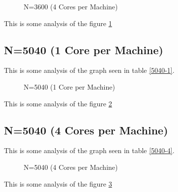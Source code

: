 \documentclass[a4paper]{article}
\begin{document}
\begin{figure}
    
    \caption{N=3600 (4 Cores per Machine)}
    \label{fig:3600_4}
\end{figure}

This is some analysis of the figure \ref{fig:3600_4}

\subsection{N=5040 (1 Core per Machine)}

This is some analysis of the graph seen in table \ref{5040-1}.

\begin{figure}
    
    \caption{N=5040 (1 Core per Machine)}
    \label{fig:5040_1}
\end{figure}

This is some analysis of the figure \ref{fig:5040_1}

\subsection{N=5040 (4 Cores per Machine)}

This is some analysis of the graph seen in table \ref{5040-4}.

\begin{figure}
    
    \caption{N=5040 (4 Cores per Machine)}
    \label{fig:5040_4}
\end{figure}

This is some analysis of the figure \ref{fig:5040_4}
\end{document}
